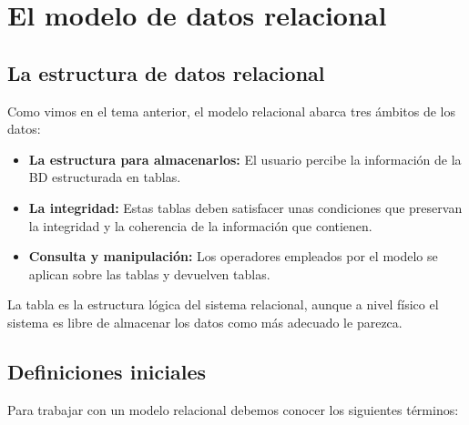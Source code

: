 \chapter{El modelo de datos relacional}

\section{La estructura de datos relacional}

Como vimos en el tema anterior, el modelo relacional abarca tres ámbitos de los datos:

\begin{itemize}
	\item\textbf{La estructura para almacenarlos:} El usuario percibe la información de la BD estructurada en tablas.
	\item\textbf{La integridad:} Estas tablas deben satisfacer unas condiciones que preservan la integridad y la coherencia de la información que contienen.
	\item\textbf{Consulta y manipulación:} Los operadores empleados por el modelo se aplican sobre las tablas y devuelven tablas.
\end{itemize}

La tabla es la estructura lógica del sistema relacional, aunque a nivel físico el sistema es libre de almacenar los datos como más adecuado le parezca.

\section{Definiciones iniciales}

Para trabajar con un modelo relacional debemos conocer los siguientes términos:

